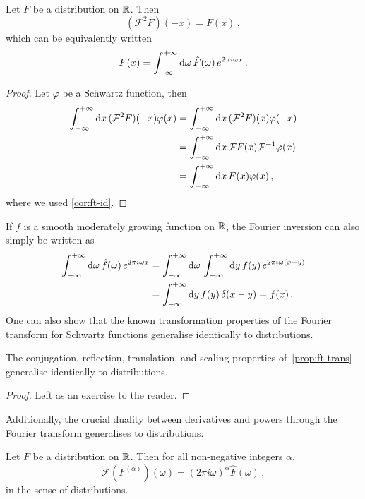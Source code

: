 \begin{theorem}
  Let $F$ be a distribution on $\mathbb{R}$. Then
  \begin{equation}
    (\mathcal{F}^2F)(-x)=F(x)\,,
  \end{equation}
  which can be equivalently written
  \begin{equation}
    F(x)=\int_{-\infty}^{+\infty}\mathrm{d}{\omega}\,\hat{F}(\omega)\,e^{2\pi i\omega x}\,.
  \end{equation}
\end{theorem}
\begin{proof}
  Let $\varphi$ be a Schwartz function, then
  \begin{align}
    \int_{-\infty}^{+\infty}\mathrm{d}{x}\,(\mathcal{F}^2F)(-x)\varphi(x)&=\int_{-\infty}^{+\infty}\mathrm{d}{x}\,(\mathcal{F}^2F)(x)\varphi(-x)\notag\\
    &=\int_{-\infty}^{+\infty}\mathrm{d}{x}\,\mathcal{F}F(x)\mathcal{F}^{-1}\varphi(x)\notag\\
    &=\int_{-\infty}^{+\infty}\mathrm{d}{x}\,F(x)\varphi(x)\,,
  \end{align}
  where we used \cref{cor:ft-id}.
\end{proof}
If $f$ is a smooth moderately growing function on $\mathbb{R}$, the Fourier inversion can also
simply be written as
\begin{align}
  \int_{-\infty}^{+\infty}\mathrm{d}{\omega}\,\hat{f}(\omega)\,e^{2\pi i\omega x}&=
  \int_{-\infty}^{+\infty}\mathrm{d}{\omega}\,\int_{-\infty}^{+\infty}\mathrm{d}{y}\,f(y)\,e^{2\pi i\omega (x-y)}\notag\\
  &=\int_{-\infty}^{+\infty}\mathrm{d}{y}\,f(y)\,\delta(x-y)=f(x)\,.
\end{align}
One can also show that the known transformation properties of the Fourier transform for
Schwartz functions generalise identically to distributions.
\begin{proposition}
  The conjugation, reflection, translation, and scaling properties of~\cref{prop:ft-trans}
  generalise identically to distributions.
\end{proposition}
\begin{proof}
  Left as an exercise to the reader.
\end{proof}
Additionally, the crucial duality between derivatives and powers through the Fourier
transform generalises to distributions.
\begin{proposition}
  \label{prop:ft-der-distrib}
  Let $F$ be a distribution on $\mathbb{R}$. Then for all non-negative integers $\alpha$,
  \begin{equation}
    \mathcal{F}(F^{(\alpha)})(\omega)=(2\pi i\omega)^{\alpha}\hat{F}(\omega)\,,
  \end{equation}
  in the sense of distributions.
\end{proposition}
